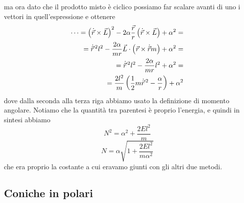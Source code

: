 \documentclass[11pt]{scrartcl}
\newcommand{\posit}{\vec{r}}
\newcommand{\veloc}{\dot{\vec{r}}}
\begin{document}
	ma ora dato che il prodotto misto è ciclico possiamo far scalare avanti di uno i vettori in quell'espressione e ottenere
	\begin{align*}
		\dots=\left(\veloc\times\vec{L} \right)^2-2\alpha \frac{\posit}{r}\left(\veloc \times \vec{L}\right)+\alpha^2= \\
		=\veloc^{\,2}l^2-\frac{2\alpha}{mr}\vec{L}\cdot\left(\posit\times \veloc m\right)+\alpha^2= \\
		= \veloc^{\,2}l^2-\frac{2\alpha}{mr}l^2+\alpha^2= \\
		= \frac{2l^2}{m}\left(\half m\veloc^{\,2}-\frac{\alpha}{r}\right)+\alpha^2
	\end{align*}
	dove dalla seconda alla terza riga abbiamo usato la definizione di momento angolare. Notiamo che la quantità tra parentesi è proprio l'energia, e quindi in sintesi abbiamo
	$$N^2=\alpha^2+\frac{2El^2}{m}$$
	$$N=\alpha\sqrt{1+\frac{2El^2}{m\alpha^2}}$$
	che era proprio la costante a cui eravamo giunti con gli altri due metodi.
	
	\subsection{Coniche in polari}
	
\end{document}
